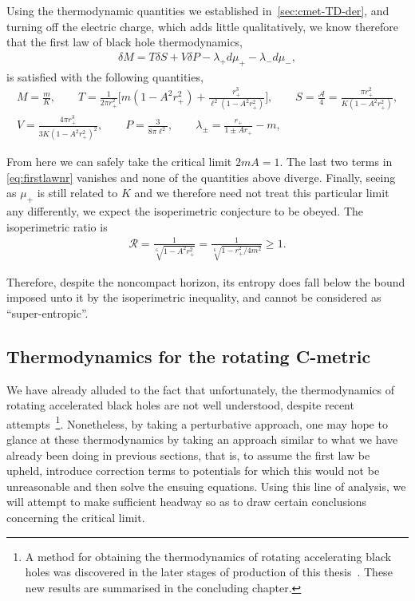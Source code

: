 \documentclass[
twoside,
openright,
frontopenright,
]{dmathesis}
\newcommand{\nn}{\nonumber}
\begin{document}
Using the thermodynamic quantities we established in~\cref{sec:cmet-TD-der}, and
turning off the electric charge, which adds little qualitatively, we know
therefore that the first law of black hole thermodynamics,
\begin{align}\label{eq:firstlawnr}
  \delta M = T\delta S + V\delta P - \lambda_+ d\mu_+ - \lambda_- d\mu_-,
\end{align}
is satisfied with the following quantities,
\begin{gather}
  M=\frac{m}{K},\qquad T=\frac{1}{2\pi
    r_+^2}\bigg[m(1-A^2 r_+^2) + \frac{r_+^3}{\ell^2(1-A^2 r_+^2)}\bigg], \qquad
  S=\frac{\mathcal{A}}{4} = \frac{\pi r_+^2}{K(1- A^2 r_+^2)},\nn\\ 
  V=\frac{4 \pi  r_+^3}{3 K (1- A^2 r_+^2)^2}, \qquad P=\frac{3}{8\pi \ell^2},
  \qquad \lambda_\pm = \frac{r_+}{1\pm A r_+} - m,
\end{gather}

From here we can safely take the critical limit $2mA = 1$. The last two terms in
\cref{eq:firstlawnr} vanishes and none of the quantities above diverge. Finally,
seeing as $\mu_+$ is still related to $K$ and we therefore need not treat this
particular limit any differently, we expect the isoperimetric
conjecture to be obeyed. The isoperimetric ratio is
\begin{align}
  \mathcal{R} =\frac{1}{\sqrt[6~]{1-A^2r_+^2}} =
  \frac{1}{\sqrt[6~]{1-r_+^2/4m^2}}\geqslant 1. 
\end{align}

Therefore, despite the noncompact horizon, its entropy does fall below the bound
imposed unto it by the isoperimetric inequality, and cannot be considered as
``super-entropic''.

\subsection{Thermodynamics for the rotating C-metric}
\label{sec:therm-rotat-c}

We have already alluded to the fact that unfortunately, the thermodynamics of
rotating accelerated black holes are not well understood, despite recent
attempts~\cite{Astorino:2016ybm}\footnote{A method for obtaining the
  thermodynamics of rotating accelerating black holes was discovered in the
  later stages of production of this thesis~\cite{Anabalon:2018aa}. These new
  results are summarised in the concluding chapter.}. Nonetheless, by taking a
perturbative approach, one may hope to glance at these thermodynamics by taking
an approach similar to what we have already been doing in previous sections,
that is, to assume the first law be upheld, introduce correction terms to
potentials for which this would not be unreasonable and then solve the ensuing
equations. Using this line of analysis, we will attempt to make sufficient
headway so as to draw certain conclusions concerning the critical limit.
\end{document}
